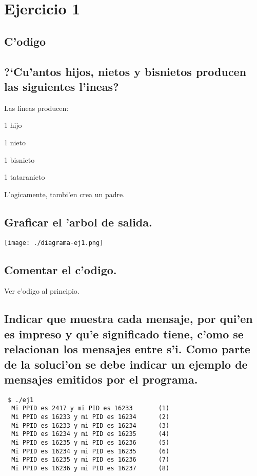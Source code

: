 \documentclass[a4paper,8pt]{article}
\newcommand{\?}{?`}
\begin{document}

\setcounter{page}{1}
\tableofcontents
\newpage
\setcounter{page}{1}

\section{Ejercicio 1}

\subsection{C'odigo}

\subsection[Punto A]{\?Cu'antos hijos, nietos y bisnietos producen las siguientes l'ineas?}
Las lineas producen:
\begin{description}
 \item 1 hijo
 \item 1 nieto
 \item 1 bisnieto
 \item 1 tataranieto
\end{description}

L'ogicamente, tambi'en crea un padre.

\subsection[Punto B]{Graficar el 'arbol de salida.}
\begin{center}
 \texttt{[image: ./diagrama-ej1.png]}
\end{center}


\subsection[Punto C]{Comentar el c'odigo.}
Ver c'odigo al principio.
\newpage
\subsection[Punto D]{Indicar que muestra cada mensaje, por qui'en es impreso y qu'e significado tiene,
c'omo se relacionan los mensajes entre s'i. Como parte de la soluci'on se debe
indicar un ejemplo de mensajes emitidos por el programa.}

\begin{lstlisting}
 $ ./ej1
  Mi PPID es 2417 y mi PID es 16233       (1)
  Mi PPID es 16233 y mi PID es 16234      (2)
  Mi PPID es 16233 y mi PID es 16234      (3)
  Mi PPID es 16234 y mi PID es 16235      (4)
  Mi PPID es 16235 y mi PID es 16236      (5)
  Mi PPID es 16234 y mi PID es 16235      (6)
  Mi PPID es 16235 y mi PID es 16236      (7)
  Mi PPID es 16236 y mi PID es 16237      (8)
\end{lstlisting}
\end{document}

